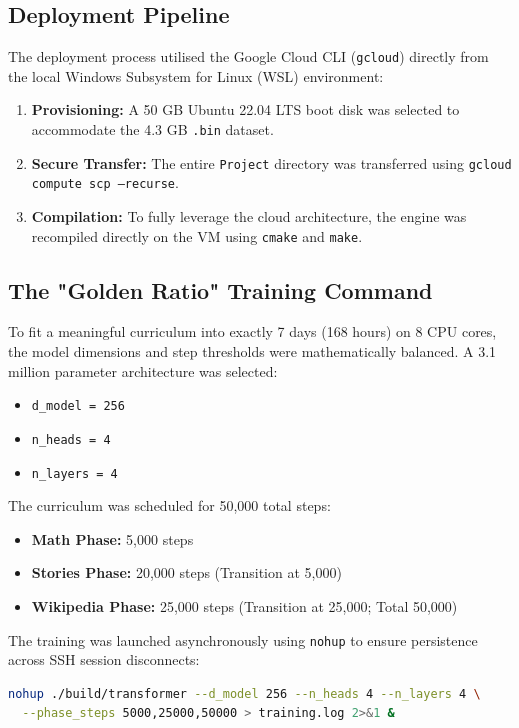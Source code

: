 \documentclass[12pt, a4paper]{article}
\begin{document}
\subsection{Deployment Pipeline}
The deployment process utilised the Google Cloud CLI (\texttt{gcloud}) directly from the local Windows Subsystem for Linux (WSL) environment:
\begin{enumerate}
    \item \textbf{Provisioning:} A 50 GB Ubuntu 22.04 LTS boot disk was selected to accommodate the 4.3 GB \texttt{.bin} dataset.
    \item \textbf{Secure Transfer:} The entire \texttt{Project} directory was transferred using \texttt{gcloud compute scp --recurse}.
    \item \textbf{Compilation:} To fully leverage the cloud architecture, the engine was recompiled directly on the VM using \texttt{cmake} and \texttt{make}.
\end{enumerate}

\subsection{The "Golden Ratio" Training Command}
To fit a meaningful curriculum into exactly 7 days (168 hours) on 8 CPU cores, the model dimensions and step thresholds were mathematically balanced. A 3.1 million parameter architecture was selected:
\begin{itemize}
    \item \texttt{d\_model = 256}
    \item \texttt{n\_heads = 4}
    \item \texttt{n\_layers = 4}
\end{itemize}

The curriculum was scheduled for 50,000 total steps:
\begin{itemize}
    \item \textbf{Math Phase:} 5,000 steps
    \item \textbf{Stories Phase:} 20,000 steps (Transition at 5,000)
    \item \textbf{Wikipedia Phase:} 25,000 steps (Transition at 25,000; Total 50,000)
\end{itemize}

The training was launched asynchronously using \texttt{nohup} to ensure persistence across SSH session disconnects:
\begin{lstlisting}[language=bash, caption={Cloud Training Command}, numbers=none]
nohup ./build/transformer --d_model 256 --n_heads 4 --n_layers 4 \
  --phase_steps 5000,25000,50000 > training.log 2>&1 &
\end{lstlisting}
\end{document}
